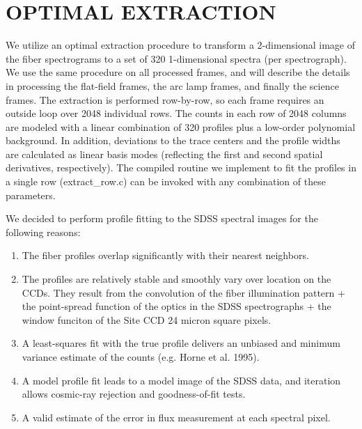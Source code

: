 \documentclass[12pt,preprint]{aastex}
\begin{document}
\section{OPTIMAL EXTRACTION}
\label{sec_extract}

We utilize an optimal extraction procedure to transform a 2-dimensional image of
the fiber spectrograms to a set of 320 1-dimensional spectra (per spectrograph).
We use the same procedure on all processed frames, 
and will describe the details in processing the flat-field frames, the
arc lamp frames, and finally the science frames.  
The extraction is performed row-by-row, so each frame requires an 
outside loop over 2048 individual rows.
The counts in each row of 2048 columns are modeled with a linear 
combination of 320 profiles plus a low-order
polynomial background.  In addition, deviations to the trace centers and
the profile widths are calculated as linear basis modes (reflecting the first
and second spatial derivatives, respectively).  The compiled routine
we implement to fit the profiles in a single row (extract\_row.c) can
be invoked with any combination of these parameters.

We decided to perform profile fitting to the 
SDSS spectral images for the following reasons:  

\begin{enumerate}

\item{The fiber profiles overlap significantly with their nearest neighbors.}

\item{The profiles are relatively stable and smoothly vary over 
location on the CCDs.  They result from the convolution of the fiber 
illumination pattern + the point-spread function
of the optics in the SDSS spectrographs + the window funciton of the 
Site CCD 24 micron square pixels. }

\item{A least-squares fit with the true profile delivers an 
unbiased and minimum variance estimate of the counts (e.g. Horne et al. 1995).}

\item{A model profile fit leads to a model image of the SDSS data,
and iteration allows cosmic-ray rejection and goodness-of-fit tests.}

\item{A valid estimate of the error in flux measurement at each spectral pixel.}

\end{enumerate}
\end{document}
